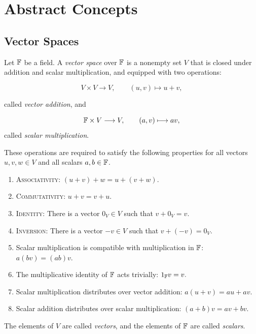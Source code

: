 \chapter{Abstract Concepts}
\section{Vector Spaces}
Let $\mathbb{F}$ be a field. A \textit{vector space} over $\mathbb{F}$ is a nonempty set $V$ that is closed under addition and scalar multiplication, and
equipped with two operations:

\[
  V\times V\longrightarrow V,
  \qquad
  (u,v)\longmapsto u+v,
\]

called \emph{vector addition}, and 

\[
  \mathbb{F}\times V\longrightarrow V,
  \qquad
  (a,v)\longmapsto av,
\]
called \emph{scalar multiplication}.

These operations are required to satisfy the following properties for
all vectors $u,v,w\in V$ and all scalars $a,b\in \mathbb{F}$.

\begin{enumerate}
\item {\scshape Associativity}:
  $
    (u+v)+w=u+(v+w).
  $

\item {\scshape Commutativity}:
  $
    u+v=v+u.
  $

  \item {\scshape Identity}: There is a vector $0_V\in V$ such that
  $
    v+0_V=v.
  $

  \item {\scshape Inversion}: There is a vector $-v\in V$ such that
  $
    v+(-v)=0_V.
  $

  \item Scalar multiplication is compatible with multiplication in
  $\mathbb{F}$:
  $
    a(bv)=(ab)v.
  $

  \item The multiplicative identity of $\mathbb{F}$ acts trivially:
  $
    1_{\mathbb{F}}v=v.
  $

  \item Scalar multiplication distributes over vector addition:
  $
    a(u+v)=au+av.
  $

  \item Scalar addition distributes over scalar multiplication:
  $
    (a+b)v=av+bv.
  $
\end{enumerate}

The elements of $V$ are called \emph{vectors}, and the elements of
$\mathbb{F}$ are called \emph{scalars}.

